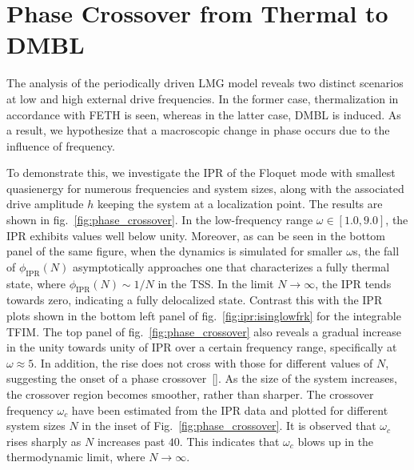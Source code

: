 \documentclass[%
reprint,
superscriptaddress,
amsmath,amssymb,
aps,
prb,
showkeys,
]{revtex4-2}
\begin{document}
\section{\label{sec:level5}Phase Crossover from Thermal to DMBL}
The analysis of the periodically driven LMG model reveals two distinct scenarios at low and high external drive frequencies. In the former case, thermalization in accordance with FETH is seen, whereas in the latter case, DMBL is induced. As a result, we hypothesize that a macroscopic change in phase occurs due to the influence of frequency. 

To demonstrate this, we investigate the IPR of the  Floquet mode with smallest quasienergy for numerous frequencies and system sizes, along with the associated drive amplitude $h$ keeping the system at a localization point. The results are shown in fig.~\ref{fig:phase_crossover}. In the low-frequency range $\omega \in \left[1.0, 9.0\right]$, the IPR exhibits values well below unity.   {Moreover, as can be seen in the bottom panel of the same figure, when the dynamics is simulated for smaller} $\omega$s, the fall of $\phi_\mathrm{IPR}(N)$ {asymptotically approaches one that characterizes a fully thermal state, where} $\phi_\mathrm{IPR}(N)\sim 1/N$ in the TSS.  In the limit  $N\rightarrow\infty$, the IPR tends towards zero, indicating a fully delocalized state. Contrast this with the IPR plots shown in the bottom left panel of fig.~\ref{fig:ipr:isinglowfrk} for the integrable TFIM.  The top panel of fig.~\ref{fig:phase_crossover} also reveals a gradual increase in the unity towards unity of IPR over a certain frequency range, specifically at $\omega \approx 5$. In addition, the rise does not cross with those for different values of $N$, suggesting the onset of a phase crossover~[\cite{sierant_2023, sachdev_quantum_2011}]. As the size of the system increases, the crossover region becomes smoother, rather than sharper.  The crossover frequency $\omega_c$ have been estimated from the IPR data and plotted for different system sizes $N$ in the inset of Fig.~\ref{fig:phase_crossover}. It is observed that $\omega_c$ rises sharply as $N$ increases past $40$. This indicates that $\omega_c$ blows up in the thermodynamic limit, where $N \to \infty$.
\end{document}
